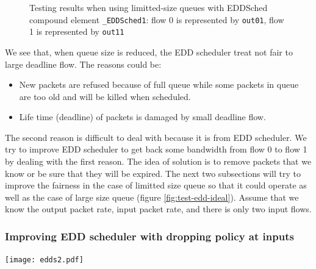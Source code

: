 \documentclass[a4paper]{article}
\begin{document}
        \begin{figure}
	          \caption{Testing results when using limitted-size queues with EDDSched compound element \texttt{\_EDDSched1}: flow 0 is represented by \texttt{out01}, flow 1 is represented by \texttt{out11}}
	          \label{fig:test-edd1}
        \end{figure}
        We see that, when queue size is reduced, the EDD scheduler treat not fair to large deadline flow. The reasons could be: 
        \begin{itemize}
        	\item New packets are refused because of full queue while some packets in queue are too old and will be killed when scheduled.
        	\item Life time (deadline) of packets is damaged by small deadline flow.  
        \end{itemize}
  The second reason is difficult to deal with because it is from EDD scheduler. We try to improve EDD scheduler to get back some bandwidth from flow 0 to flow 1 by dealing with the first reason. The idea of solution is to remove packets that we know or be sure that they will be expired. The next two subsections will try to improve the fairness in the case of limitted size queue so that it could operate as well as the case of large size queue (figure \ref{fig:test-edd-ideal}). Assume that we know the output packet rate, input packet rate, and there is only two input flows. 
        
  \subsubsection{Improving EDD scheduler with dropping policy at inputs}

  \begin{center}
	  \texttt{[image: edds2.pdf]}
	  \label{fig:edds2}
    \end{center}
\end{document}
